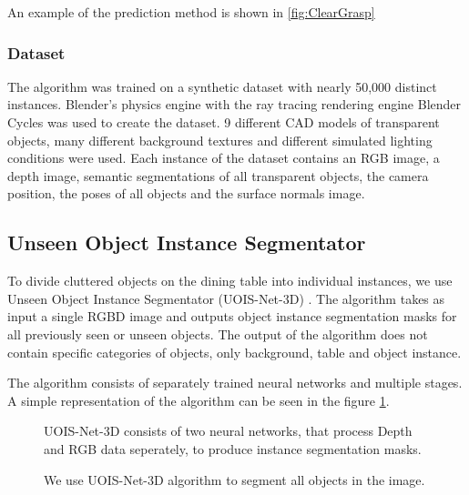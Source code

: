 \documentclass[10pt,twocolumn,letterpaper]{article}
\begin{document}
An example of the prediction method is shown in \ref{fig:ClearGrasp}

\subsubsection{Dataset}

The algorithm was trained on a synthetic dataset with nearly 50,000 distinct instances. Blender's physics engine with the ray tracing rendering engine Blender Cycles was used to create the dataset. 9 different CAD models of transparent objects, many different background textures and different simulated lighting conditions were used. Each instance of the dataset contains an RGB image, a depth image, semantic segmentations of all transparent objects, the camera position, the poses of all objects and the surface normals image. 



\subsection{Unseen Object Instance Segmentator}

To divide cluttered objects on the dining table into individual instances, we use Unseen Object Instance Segmentator (UOIS-Net-3D) \cite{Xie_Xiang_Mousavian_Fox_2021}. The algorithm takes as input a single RGBD image and outputs object instance segmentation masks for all previously seen or unseen objects. The output of the algorithm does not contain specific categories of objects, only background, table and object instance.

The algorithm consists of separately trained neural networks and multiple stages. A simple representation of the algorithm can be seen in the figure \ref{fig:UOIS-scheme}.

\begin{figure}
\begin{center}
\end{center}
   \caption{UOIS-Net-3D consists of two neural networks, that process Depth and RGB data seperately, to produce instance segmentation masks.}
\label{fig:UOIS-scheme}
\end{figure}

\begin{figure}
\begin{center}
\end{center}
   \caption{We use UOIS-Net-3D algorithm to segment all objects in the image.}
\label{fig:UOIS-example}
\end{figure}
\end{document}
